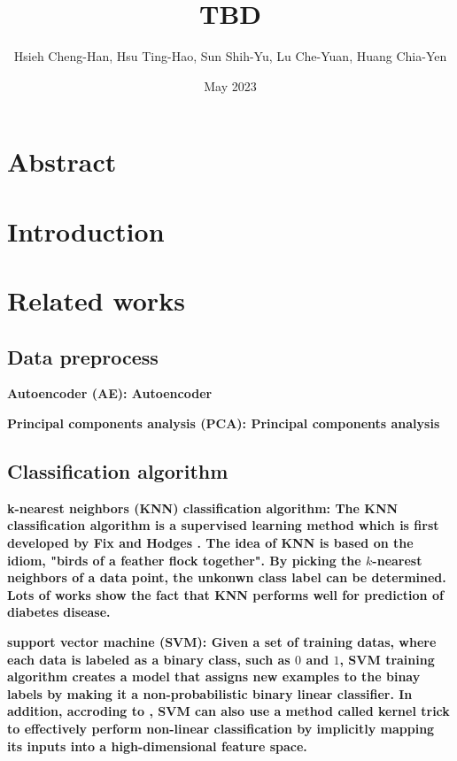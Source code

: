 \documentclass[twocolumn,10pt]{article}
\begin{document}
\title{TBD}

\author{Hsieh Cheng-Han, Hsu Ting-Hao, Sun Shih-Yu, Lu Che-Yuan, Huang Chia-Yen}
\date{May 2023}
\maketitle

\section*{Abstract}

\section{Introduction}
\label{sec:Introduction}

\section{Related works}
\label{sec:Related works}

\subsection*{Data preprocess}

\bf{Autoencoder (AE)}: \rm{Autoencoder}

\bf{Principal components analysis (PCA)}: \rm{Principal components analysis}

\subsection*{Classification algorithm}

\bf{k-nearest neighbors (KNN) classification algorithm}: \rm{The} KNN classification algorithm is a supervised learning 
method which is first developed by Fix and Hodges \cite{10.2307/1403797}. The idea of KNN is based on the idiom, 
"birds of a feather flock together". By picking the $k$-nearest neighbors of a data point, the unkonwn class label 
can be determined. Lots of works \cite{6528591} \cite{8276012} \cite{vijayan2014study} show the fact that KNN performs  
well for prediction of diabetes disease.

\bf{support vector machine (SVM)}: \rm{Given} a set of training datas, where each data is labeled as a binary class, such as 
$0$ and $1$, SVM training algorithm creates a model that assigns new examples to the binay labels by making it a non-probabilistic 
binary linear classifier. In addition, accroding to \cite{amari1999improving} \cite{hofmann2006support}, SVM can also use a 
method called kernel trick to effectively perform non-linear classification by implicitly mapping its inputs into a high-dimensional 
feature space.
\end{document}
